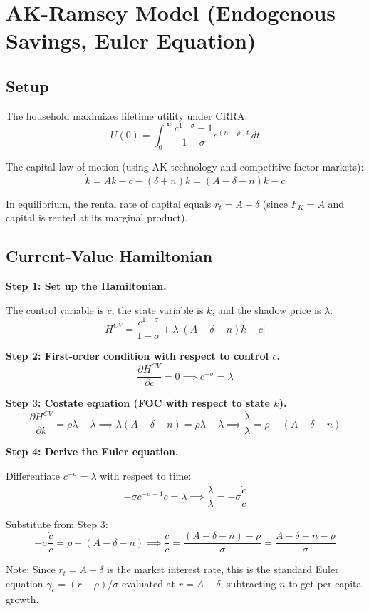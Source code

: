 \documentclass[a4paper,11pt]{article}
\begin{document}
\clearpage

\section{AK-Ramsey Model (Endogenous Savings, Euler Equation)}

\subsection*{Setup}

The household maximizes lifetime utility under CRRA:
\[
U(0) = \int_0^\infty \frac{c^{1-\sigma}-1}{1-\sigma} e^{(n-\rho)t} \, dt
\]

The capital law of motion (using AK technology and competitive factor markets):
\[
\dot{k} = Ak - c - (\delta + n)k = (A - \delta - n)k - c
\]

In equilibrium, the rental rate of capital equals $r_t = A - \delta$ (since $F_K = A$ and capital is rented at its marginal product).

\subsection*{Current-Value Hamiltonian}

\begin{derivationbox}
\textbf{Step 1: Set up the Hamiltonian.}

The control variable is $c$, the state variable is $k$, and the shadow price is $\lambda$:
\[
H^{CV} = \frac{c^{1-\sigma}}{1-\sigma} + \lambda\bigl[(A - \delta - n)k - c\bigr]
\]

\textbf{Step 2: First-order condition with respect to control $c$.}
\[
\frac{\partial H^{CV}}{\partial c} = 0 \implies c^{-\sigma} = \lambda
\]

\textbf{Step 3: Costate equation (FOC with respect to state $k$).}
\[
\frac{\partial H^{CV}}{\partial k} = \rho\lambda - \dot{\lambda}
\implies \lambda(A - \delta - n) = \rho\lambda - \dot{\lambda}
\implies \frac{\dot{\lambda}}{\lambda} = \rho - (A - \delta - n)
\]

\textbf{Step 4: Derive the Euler equation.}

Differentiate $c^{-\sigma} = \lambda$ with respect to time:
\[
-\sigma c^{-\sigma - 1}\dot{c} = \dot{\lambda}
\implies \frac{\dot{\lambda}}{\lambda} = -\sigma \frac{\dot{c}}{c}
\]

Substitute from Step 3:
\[
-\sigma \frac{\dot{c}}{c} = \rho - (A - \delta - n)
\implies \frac{\dot{c}}{c} = \frac{(A - \delta - n) - \rho}{\sigma} = \frac{A - \delta - n - \rho}{\sigma}
\]

Note: Since $r_t = A - \delta$ is the market interest rate, this is the standard Euler equation $\gamma_c = (r - \rho)/\sigma$ evaluated at $r = A - \delta$, subtracting $n$ to get per-capita growth.
\end{derivationbox}
\end{document}
